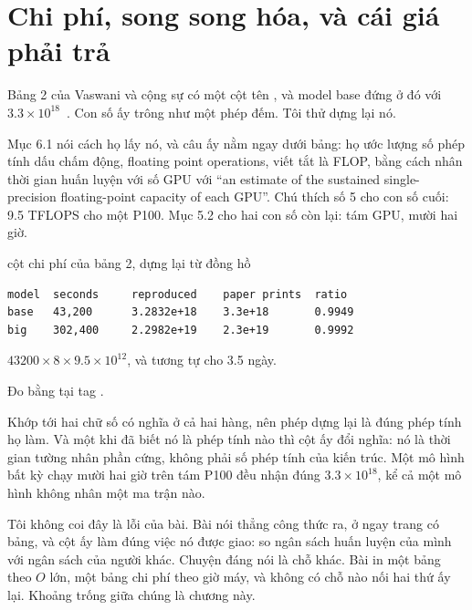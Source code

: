 \chapter{Chi phí, song song hóa, và cái giá phải trả}
\label{ch:chi-phi-va-song-song}

Bảng 2 của Vaswani và cộng sự có một cột tên , và
model base đứng ở đó với \(3.3 \times 10^{18}\)~\autocite{vaswani2017attention}.
Con số ấy trông như một phép đếm. Tôi thử dựng lại nó.

Mục 6.1 nói cách họ lấy nó, và câu ấy nằm ngay dưới bảng: họ ước lượng số phép
tính dấu chấm động, floating point operations, viết tắt là FLOP, bằng cách nhân
thời gian huấn luyện với số GPU với
\enquote{an estimate of the sustained single-precision floating-point capacity
of each GPU}. Chú thích số 5 cho con số cuối: 9.5 TFLOPS cho một P100. Mục 5.2
cho hai con số còn lại: tám GPU, mười hai giờ.

\begin{measured}{cột chi phí của bảng 2, dựng lại từ đồng hồ}
\begin{verbatim}
model  seconds     reproduced    paper prints  ratio
base   43,200      3.2832e+18    3.3e+18       0.9949
big    302,400     2.2982e+19    2.3e+19       0.9992
\end{verbatim}

\(43200 \times 8 \times 9.5 \times 10^{12}\), và tương tự cho 3.5 ngày.

Đo bằng  tại tag .
\end{measured}

Khớp tới hai chữ số có nghĩa ở cả hai hàng, nên phép dựng lại là đúng phép tính
họ làm. Và một khi đã biết nó là phép tính nào thì cột ấy đổi nghĩa: nó là thời
gian tường nhân phần cứng, không phải số phép tính của kiến trúc. Một mô hình
bất kỳ chạy mười hai giờ trên tám P100 đều nhận đúng \(3.3 \times 10^{18}\), kể
cả một mô hình không nhân một ma trận nào.

Tôi không coi đây là lỗi của bài. Bài nói thẳng công thức ra, ở ngay trang có
bảng, và cột ấy làm đúng việc nó được giao: so ngân sách huấn luyện của mình với
ngân sách của người khác. Chuyện đáng nói là chỗ khác. Bài in một bảng
 theo \(O\) lớn, một bảng chi phí theo giờ máy, và
không có chỗ nào nối hai
thứ ấy lại. Khoảng trống giữa chúng là chương này.

